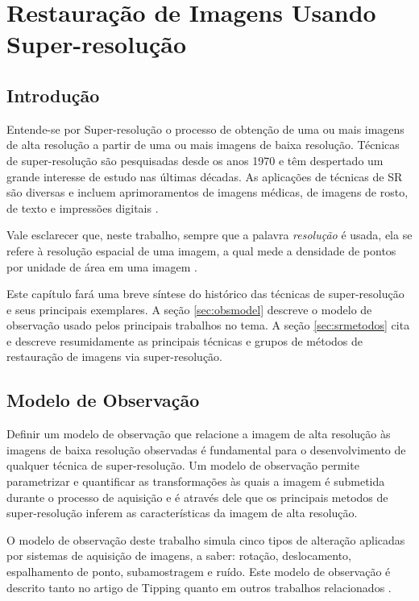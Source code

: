 \chapter{Restauração de Imagens Usando Super-resolução}
\section{Introdução}
Entende-se por Super-resolução o processo de obtenção de uma ou mais imagens de alta resolução a partir de uma ou mais imagens de baixa resolução.
Técnicas de super-resolução são pesquisadas desde os anos 1970 e têm despertado um grande interesse de estudo nas últimas décadas.
As aplicações de técnicas de SR são diversas e incluem aprimoramentos de imagens médicas, de imagens de rosto, de texto e impressões digitais \cite{nasrollahi2014super}.

Vale esclarecer que, neste trabalho, sempre que a palavra \textit{resolução} é usada,
ela se refere à resolução espacial de uma imagem, a qual mede a densidade de pontos por
unidade de área em uma imagem \cite{zibetti2007super}.

Este capítulo fará uma breve síntese do histórico das técnicas de super-resolução e seus
principais exemplares.
A seção \ref{sec:obsmodel} descreve o modelo de observação usado pelos principais
trabalhos no tema. A seção \ref{sec:srmetodos} cita e descreve resumidamente as
principais técnicas e grupos de métodos de restauração de imagens via super-resolução. 

\section{\label{sec:obsmodel}Modelo de Observação}


Definir um modelo de observação que relacione a imagem de alta resolução às imagens
de baixa resolução observadas é fundamental para o desenvolvimento de qualquer técnica
de super-resolução. Um modelo de observação permite parametrizar e quantificar as
transformações às quais a imagem é submetida durante o processo de aquisição e é
através dele que os principais metodos de super-resolução inferem as características
da imagem de alta resolução.

O modelo de observação deste trabalho simula cinco tipos de alteração aplicadas por
sistemas de aquisição de imagens, a saber: rotação, deslocamento, espalhamento de
ponto, subamostragem e ruído.
Este modelo de observação é descrito tanto no artigo de Tipping
\cite{tipping2003bayesian} quanto em outros trabalhos relacionados \cite{pickup2007bayesian, Capel01a}.

